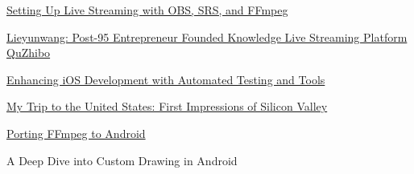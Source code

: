 \begin{cventries}
{\begin{cvitems}
        \item \href{https://lzwjava.com/streaming-en}{Setting Up Live Streaming with OBS, SRS, and FFmpeg}
        \item \href{https://lzwjava.com/lieyun-en}{Lieyunwang: Post-95 Entrepreneur Founded Knowledge Live Streaming Platform QuZhibo}
        \item \href{https://lzwjava.com/ios-test-en}{Enhancing iOS Development with Automated Testing and Tools}
        \item \href{https://lzwjava.com/silicon-valley-trip}{My Trip to the United States: First Impressions of Silicon Valley}
        \item \href{https://lzwjava.com/ffmpeg-android-port}{Porting FFmpeg to Android}
        \item A Deep Dive into Custom Drawing in Android
      \end{cvitems}
    }

\end{cventries}
